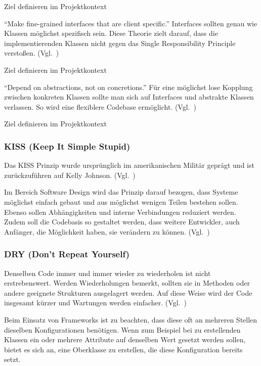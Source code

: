 \color{red}
Ziel definieren im Projektkontext
\color{black}

\enquote{Make fine-grained interfaces that are client specific.}\cite{solid}
Interfaces sollten genau wie Klassen möglichst spezifisch sein.
Diese Theorie zielt darauf, dass die implementierenden Klassen nicht gegen das Single Responsibility Principle verstoßen.
(Vgl.~\cite{design-patterns-php-laravel})

\color{red}
Ziel definieren im Projektkontext
\color{black}

\enquote{Depend on abstractions, not on concretions.}\cite{solid}
Für eine möglichst lose Kopplung zwischen konkreten Klassen sollte man sich auf Interfaces und abstrakte Klassen verlassen.
So wird eine flexiblere Codebase ermöglicht.
(Vgl.~\cite{design-patterns-php-laravel})

\color{red}
Ziel definieren im Projektkontext
\color{black}

\newpage

\subsubsection{KISS (Keep It Simple Stupid)}
Das KISS Prinzip wurde ursprünglich im amerikanischen Militär geprägt und ist zurückzuführen auf Kelly Johnson.
(Vgl.~\cite{kelly-johnson-memoir})

Im Bereich Software Design wird das Prinzip darauf bezogen, dass Systeme möglichst einfach gebaut und aus möglichst wenigen Teilen bestehen sollen.
Ebenso sollen Abhängigkeiten und interne Verbindungen reduziert werden.
Zudem soll die Codebasis so gestaltet werden, dass weitere Entwickler, auch Anfänger, die Möglichkeit haben, sie verändern zu können.
(Vgl.~\cite{kiss-principle-explained})

\subsubsection{DRY (Don’t Repeat Yourself)}
Denselben Code immer und immer wieder zu wiederholen ist nicht erstrebenswert.
Werden Wiederholungen bemerkt, sollten sie in Methoden oder andere geeignete Strukturen ausgelagert werden.
Auf diese Weise wird der Code insgesamt kürzer und Wartungen werden einfacher.
(Vgl.~\cite{the-pragmatic-programmer})

Beim Einsatz von Frameworks ist zu beachten, dass diese oft an mehreren Stellen dieselben Konfigurationen benötigen.
Wenn zum Beispiel bei zu erstellenden Klassen ein oder mehrere Attribute auf denselben Wert gesetzt werden sollen, bietet es sich an, eine Oberklasse zu erstellen, die diese Konfiguration bereits setzt.

